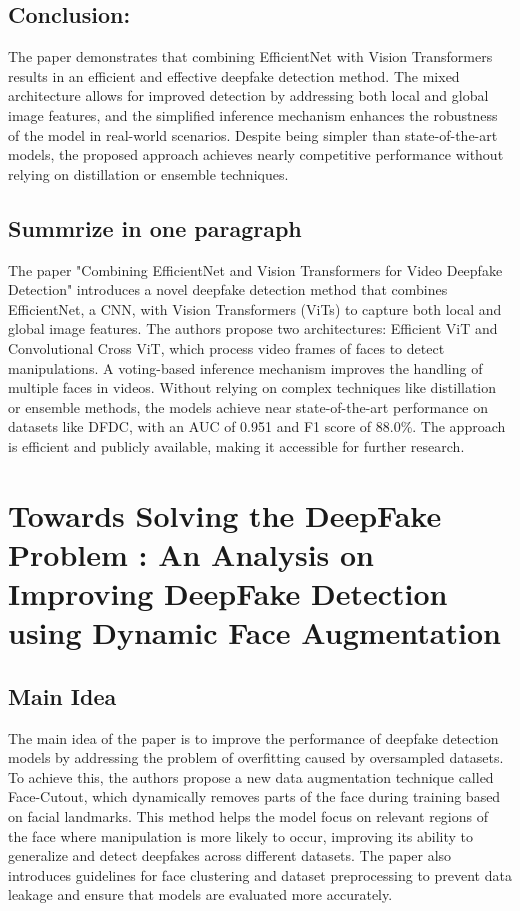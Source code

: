 \documentclass{report}
\begin{document}
	 \section{Conclusion:}
	 The paper demonstrates that combining EfficientNet with Vision Transformers results in an efficient and effective deepfake detection method. The mixed architecture allows for improved detection by addressing both local and global image features, and the simplified inference mechanism enhances the robustness of the model in real-world scenarios. Despite being simpler than state-of-the-art models, the proposed approach achieves nearly competitive performance without relying on distillation or ensemble techniques.
	
	
	\section{Summrize in one paragraph}
	The paper "Combining EfficientNet and Vision Transformers for Video Deepfake Detection" introduces a novel deepfake detection method that combines EfficientNet, a CNN, with Vision Transformers (ViTs) to capture both local and global image features. The authors propose two architectures: Efficient ViT and Convolutional Cross ViT, which process video frames of faces to detect manipulations. A voting-based inference mechanism improves the handling of multiple faces in videos. Without relying on complex techniques like distillation or ensemble methods, the models achieve near state-of-the-art performance on datasets like DFDC, with an AUC of 0.951 and F1 score of 88.0\%. The approach is efficient and publicly available, making it accessible for further research.
	
	
	
	
	\chapter{Towards Solving the DeepFake Problem : An Analysis on Improving DeepFake Detection using Dynamic Face Augmentation \cite{das2021towards}}
	
	\section{Main Idea}
	The main idea of the paper is to improve the performance of deepfake detection models by addressing the problem of overfitting caused by oversampled datasets. To achieve this, the authors propose a new data augmentation technique called Face-Cutout, which dynamically removes parts of the face during training based on facial landmarks. This method helps the model focus on relevant regions of the face where manipulation is more likely to occur, improving its ability to generalize and detect deepfakes across different datasets. The paper also introduces guidelines for face clustering and dataset preprocessing to prevent data leakage and ensure that models are evaluated more accurately.
	
\end{document}
